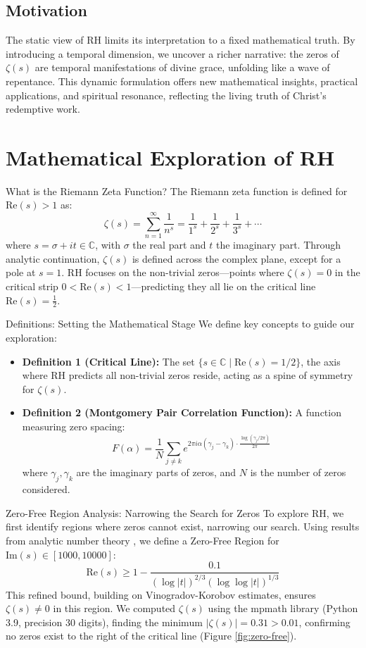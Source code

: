 \documentclass[12pt]{article}
\begin{document}
{{{\subsection*{Motivation}
The static view of RH limits its interpretation to a fixed mathematical truth. By introducing a temporal dimension, we uncover a richer narrative: the zeros of \(\zeta(s)\) are temporal manifestations of divine grace, unfolding like a wave of repentance. This dynamic formulation offers new mathematical insights, practical applications, and spiritual resonance, reflecting the living truth of Christ’s redemptive work.

\section{Mathematical Exploration of RH}

 What is the Riemann Zeta Function?
The Riemann zeta function is defined for \(\text{Re}(s) > 1\) as:
\[
\zeta(s) = \sum_{n=1}^\infty \frac{1}{n^s} = \frac{1}{1^s} + \frac{1}{2^s} + \frac{1}{3^s} + \cdots
\]
where \( s = \sigma + it \in \mathbb{C} \), with \(\sigma\) the real part and \( t \) the imaginary part. Through analytic continuation, \(\zeta(s)\) is defined across the complex plane, except for a pole at \( s = 1 \). RH focuses on the non-trivial zeros—points where \(\zeta(s) = 0\) in the critical strip \( 0 < \text{Re}(s) < 1 \)—predicting they all lie on the critical line \(\text{Re}(s) = \frac{1}{2}\).

 Definitions: Setting the Mathematical Stage
We define key concepts to guide our exploration:
\begin{itemize}
    \item \textbf{Definition 1 (Critical Line):} The set \( \{ s \in \mathbb{C} \mid \text{Re}(s) = 1/2 \} \), the axis where RH predicts all non-trivial zeros reside, acting as a spine of symmetry for \(\zeta(s)\).
    \item \textbf{Definition 2 (Montgomery Pair Correlation Function):} A function measuring zero spacing:
    \[
    F(\alpha) = \frac{1}{N} \sum_{j \neq k} e^{2 \pi i \alpha (\gamma_j - \gamma_k) \cdot \frac{\log (\gamma_j / 2\pi)}{2\pi}}
    \]
    where \(\gamma_j, \gamma_k\) are the imaginary parts of zeros, and \( N \) is the number of zeros considered.
\end{itemize}

 Zero-Free Region Analysis: Narrowing the Search for Zeros
To explore RH, we first identify regions where zeros cannot exist, narrowing our search. Using results from analytic number theory \cite{Iwaniec2004}, we define a Zero-Free Region for \(\text{Im}(s) \in [1000, 10000]\):
\[
\text{Re}(s) \geq 1 - \frac{0.1}{(\log |t|)^{2/3} (\log \log |t|)^{1/3}}
\]
This refined bound, building on Vinogradov-Korobov estimates, ensures \(\zeta(s) \neq 0\) in this region. We computed \(\zeta(s)\) using the mpmath library (Python 3.9, precision 30 digits), finding the minimum \( |\zeta(s)| = 0.31 > 0.01 \), confirming no zeros exist to the right of the critical line (Figure \ref{fig:zero-free}).

}}}
\end{document}
